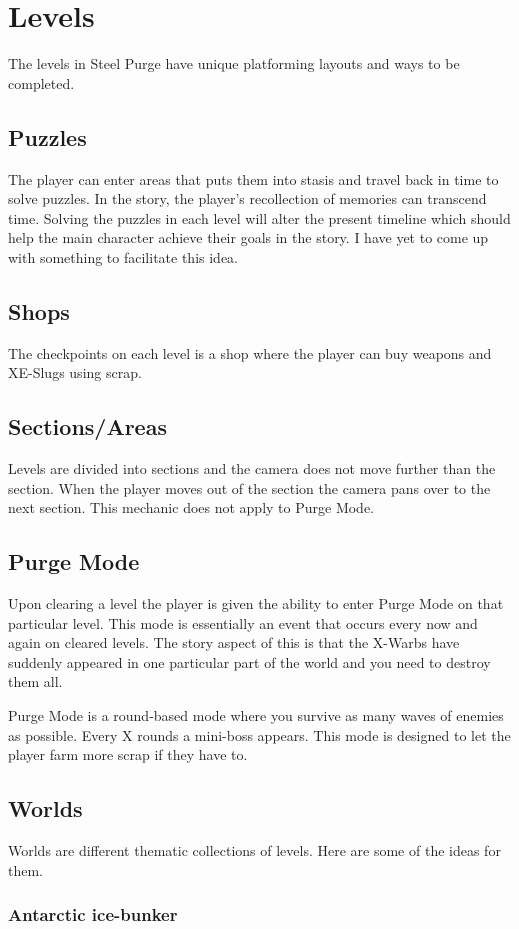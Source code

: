 \documentclass[../Main.tex]{subfiles}
\begin{document}
\section{Levels}

The levels in Steel Purge have unique platforming layouts and ways to be completed.

\subsection{Puzzles}

The player can enter areas that puts them into stasis and travel back in time to solve puzzles. In the story, the player's recollection of memories can transcend time. Solving the puzzles in each level will alter the present timeline which should help the main character achieve their goals in the story. I have yet to come up with something to facilitate this idea. 

\subsection{Shops}

The checkpoints on each level is a shop where the player can buy weapons and XE-Slugs using scrap.

\subsection{Sections/Areas}

Levels are divided into sections and the camera does not move further than the section. When the player moves out of the section the camera pans over to the next section. This mechanic does not apply to Purge Mode.

\subsection{Purge Mode}

Upon clearing a level the player is given the ability to enter Purge Mode on that particular level. This mode is essentially an event that occurs every now and again on cleared levels. The story aspect of this is that the X-Warbs have suddenly appeared in one particular part of the world and you need to destroy them all.

Purge Mode is a round-based mode where you survive as many waves of enemies as possible. Every X rounds a mini-boss appears. This mode is designed to let the player farm more scrap if they have to.

\subsection{Worlds}

Worlds are different thematic collections of levels. Here are some of the ideas for them.

\subsubsection{Antarctic ice-bunker}
\end{document}
